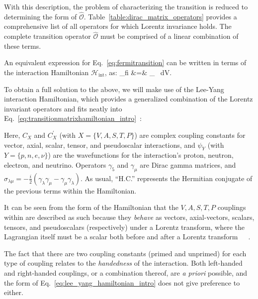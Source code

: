 With this description, the problem of characterizing the transition is reduced to determining the form of $\mathcal{\hat{O}}$.  %
Table~\ref{table:dirac_matrix_operators} provides a comprehensive list of all operators for which Lorentz invariance holds.  The complete transition operator $\mathcal{\hat{O}}$ must be comprised of a linear combination of these terms.  


An equivalent expression for Eq.~\ref{eq:fermitransition} can be written in terms of the interaction Hamiltonian $\mathcal{H}_{\mathrm{int}}$, as:
\bea
{}_{fi} &=& \int \! _{} \, \textrm{d}V. 
\label{eq:transitionmatrixhamiltonian_intro}
\eea 

To obtain a full solution to the above, we will make use of the Lee-Yang interaction Hamiltonian, which provides a generalized combination of the Lorentz invariant operators and fits neatly into Eq.~\ref{eq:transitionmatrixhamiltonian_intro}~\cite{LeeYang}:

Here, $C_X$ and $C_X^{\prime}$ (with $X=\{V,A,S,T,P\}$) are complex coupling constants for vector, axial, scalar, tensor, and pseudoscalar interactions, and $\psi_Y$ (with $Y=\{p,n,e,\nu\}$) are the wavefunctions for the interaction's proton, neutron, electron, and neutrino.  Operators $\gamma_5$ and $\gamma_\mu$ are Dirac gamma matrices, and $\mbox{$\sigma_{\lambda\mu} = -\frac{i}{2}(\gamma_\lambda \gamma_\mu - \gamma_\mu\gamma_\lambda )$}$.  As usual, ``H.C.'' represents the Hermitian conjugate of the previous terms within the Hamiltonian.

It can be seen from the form of the Hamiltonian that the $V,A,S,T,P$ couplings within are described as such because they \emph{behave} as vectors, axial-vectors, scalars, tensors, and pseudoscalars (respectively) under a Lorentz transform, where the Lagrangian itself must be a scalar both before and after a Lorentz transform~\cite{LeeYang}~\cite{Falkowski2021}~\cite{hong_sternberg_garcia}.

The fact that there are two coupling constants (primed and unprimed) for each type of coupling relates to the \emph{handedness} of the interaction.  Both left-handed and right-handed couplings, or a combination thereof, are \emph{a priori} possible, and the form of Eq.~\ref{eq:lee_yang_hamiltonian_intro} does not give preference to either.

